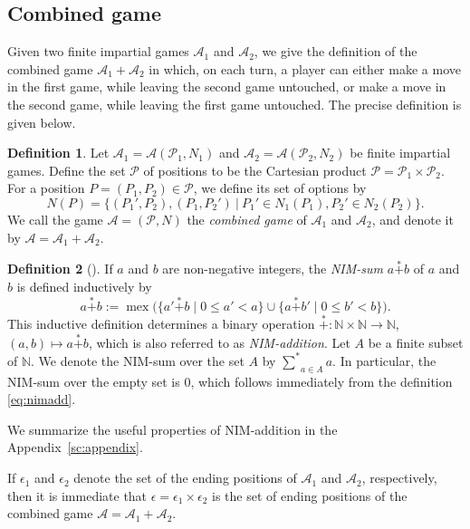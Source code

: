 \documentclass[a4paper,11pt]{amsart}
\theoremstyle{definition}
\newtheorem{dfn}{Definition}[section]
\newcommand{\mex}{\operatorname{mex}}
\newcommand{\nimadd}{\overset{*}{+}}
\newcommand{\nimsum}{{\sum}^{*}}
\numberwithin{equation}{section}
\def\Non{\mathbb{N}}
\def\P{\mathcal{P}}
\def\Game{\mathscr{A}}
\begin{document}
\subsection{Combined game}
%
%
Given two finite impartial games $\Game_1$ and $\Game_2$,
we give the definition of the combined game $\Game_1+\Game_2$
in which, on each turn, a player can either make a move in the first game, while leaving the second game untouched, 
or make a move in the second game, while leaving the first game untouched.
The precise definition is given below.
%
\begin{dfn}
%
Let $\Game_1=\Game(\P_1,N_1)$ and $\Game_2=\Game(\P_2,N_2)$ be finite impartial games.
%
Define the set $\P$ of positions to be the Cartesian product $\P=\P_1\times \P_2$.
For a position $P=(P_1,P_2)\in \P$, we define its set of options by
\begin{equation}\label{eq:CombinedGame}
	N(P)=\{(P_1',P_2),(P_1,P_2')\ |\ P_1'\in N_{1}(P_1),P_2'\in N_{2}(P_2)\}.
\end{equation}
%
We call the game $\Game=(\P,N)$ the \textsl{combined game} of $\Game_1$ and $\Game_2$,
and denote it by $\Game=\Game_1+\Game_2$.
%
\end{dfn}
%
%
%
\begin{dfn}[\cite{ONAG,Lenstra,Sato}]\label{def:Nimadd}
%
If $a$ and $b$ are non-negative integers,
the \textsl{NIM-sum} $a \nimadd b$ of $a$ and $b$ is defined inductively by
\begin{equation}\label{eq:nimadd}
a \nimadd b 
:= 
\mex\bigl(
	\{ a' \nimadd b \mid 0 \leq a' < a \}
	\cup
	\{ a \nimadd b' \mid 0 \leq b' < b \}
\bigr) .
\end{equation}
This inductive definition determines a binary operation
$\nimadd \colon \Non \times \Non \rightarrow \Non$, $(a, b) \mapsto a \nimadd b$,
which is also referred to as \textsl{NIM-addition}.
%
Let $A$ be a finite subset of $\Non$.
We denote the NIM-sum over the set $A$
by ${\nimsum}_{a \in A}a$.
In particular, the NIM-sum over the empty set is $0$, which follows immediately from the definition \eqref{eq:nimadd}.
%
\end{dfn}
%
We summarize the useful properties of NIM-addition in the Appendix~\ref{sc:appendix}.
%
\par
%
If $\epsilon_1$ and $\epsilon_2$ denote the set of the ending positions of $\Game_1$ and $\Game_2$, respectively,
then it is immediate that $\epsilon=\epsilon_1\times\epsilon_2$ is the set of ending positions of the combined game $\Game=\Game_1+\Game_2$.
\end{document}
